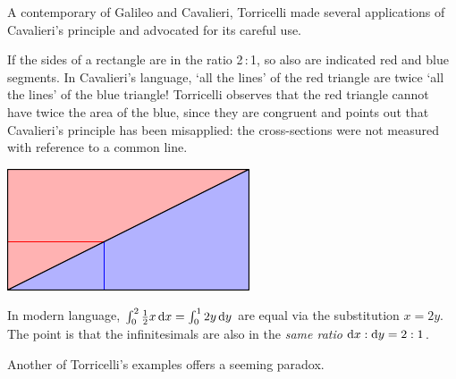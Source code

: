 \goodbreak

 A contemporary of Galileo and Cavalieri, Torricelli made several applications of Cavalieri's principle and advocated for its careful use.

\begin{minipage}[t]{0.7\linewidth}\vspace{0pt}
	If the sides of a rectangle are in the ratio 2\,:\,1, so also are indicated red and blue segments. In Cavalieri's language, `all the lines' of the red triangle are twice `all the lines' of the blue triangle! Torricelli observes that the red triangle cannot have twice the area of the blue, since they are congruent and points out that Cavalieri's principle has been misapplied: the cross-sections were not measured with reference to a common line.
\end{minipage}
\hfill
\begin{minipage}[t]{0.29\linewidth}\vspace{0pt}
	\flushright\includegraphics{analytic-torri1}
\end{minipage}\medbreak

In modern language, $\int_0^2\frac 12x\,{\mathrm{d} x}=\int_0^12y\,{\mathrm{d} y}$ are equal via the substitution $x=2y$. The point is that the infinitesimals are also in the \emph{same ratio} ${\mathrm{d} x}:{\mathrm{d} y}=2:1$.\bigbreak


Another of Torricelli's examples offers a seeming paradox.

